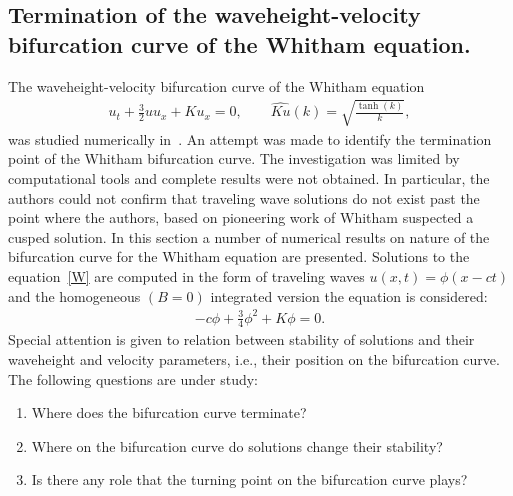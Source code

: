 \subsection{Termination of the waveheight-velocity bifurcation curve of the Whitham equation.}
\label{sec-W-term}
The waveheight-velocity bifurcation curve of the Whitham equation 
\begin{align}
	u_t + \frac{3}{2} u u_x + Ku_x = 0, \qquad 
	\widehat{Ku}(k) = \sqrt{\frac{\tanh(k)}{k}},  \label{W}
\end{align}
was studied numerically in~\cite{EK2}. 	
An attempt was made to identify the termination point of the Whitham bifurcation curve. 
The investigation was limited by computational tools and complete results were not obtained. 
In particular, the authors could not confirm that traveling wave solutions do not exist 
past the point where the authors, based on pioneering work of Whitham
\cite{Wh1} suspected a cusped solution.
In this section a number of numerical results on nature of the bifurcation curve
for the Whitham equation are presented.
Solutions to the equation~\eqref{W}
are computed in the form of traveling waves $u(x,t) = \phi(x - c t)$
and the homogeneous $(B = 0)$ integrated version the equation is considered:
\begin{align}
-c \phi + \frac{3}{4} \phi^2 + K \phi = 0. \label{W-int}
\end{align}
Special attention is given to relation between stability of solutions 
and their waveheight and velocity parameters, i.e., their position on the bifurcation curve. 
The following questions are under study: 
\begin{enumerate}[label=\alph*)] %
\item Where does the bifurcation curve terminate?

\item Where on the bifurcation curve do solutions change their stability?

\item Is there any role that the turning point on the bifurcation curve plays?
\end{enumerate}



